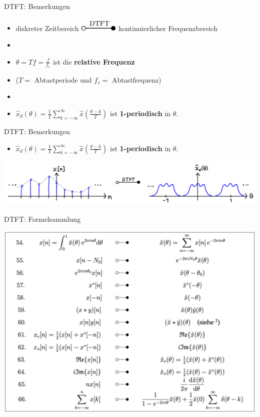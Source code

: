 \documentclass[14pt, aspectratio=169, handout]{beamer}
\newcommand{\transform}[2]{%
    \begin{tikzpicture}
        \draw[thick] (0,0) circle (0.1);
        \draw[thick] (0.1,0) -- (#2,0) node[midway, above] {#1};
        \filldraw[thick] (#2,0) circle (0.1);
    \end{tikzpicture}%
}
\begin{document}
\begin{frame}{DTFT: Bemerkungen}
    \begin{itemize}
    \item diskreter Zeitbereich $ \transform{\text{DTFT}}{1.5}$ kontinuierlicher Frequenzbereich
    \item[] 
    \item $\theta = Tf = \frac{f}{f_s}$ ist die \textbf{relative Frequenz}
    \item[] ($T=$ Abtastperiode und $f_s=$ Abtastfrequenz)
    \item[] 
    \item $\hat{x}_d(\theta) = \displaystyle\frac{1}{T} \sum_{k=-\infty}^\infty \hat{x}\left( \frac{\theta - k}{T} \right)$ ist \textbf{1-periodisch} in $\theta$.
\end{itemize}
\end{frame}

\begin{frame}{DTFT: Bemerkungen}
\begin{itemize}
    \item $\hat{x}_d(\theta) = \displaystyle\frac{1}{T} \sum_{k=-\infty}^\infty \hat{x}\left( \frac{\theta - k}{T} \right)$ ist \textbf{1-periodisch} in $\theta$.
\end{itemize}
    \includegraphics[width=\linewidth]{figures/dtft.jpg}
\end{frame}

\begin{frame}{DTFT: Formelsammlung}
    \begin{center}
        \includegraphics[width=0.7\linewidth]{figures/DTFT.png}
    \end{center}
\end{frame}
\end{document}
